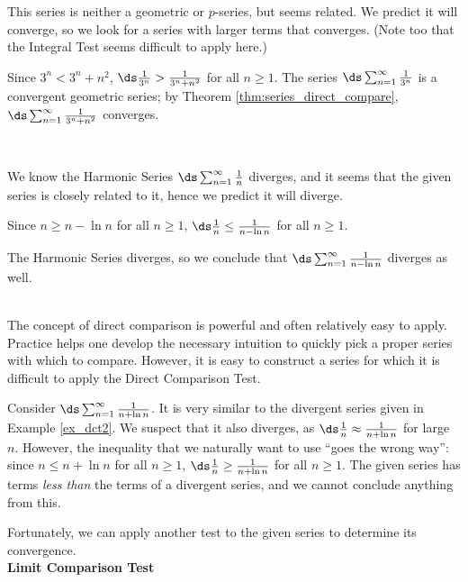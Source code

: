 {This series is neither a geometric or $p$-series, but seems related. We predict it will converge, so we look for a series with larger terms that converges. (Note too that the Integral Test seems difficult to apply here.)

Since $3^n < 3^n+n^2$, $\ds \frac1{3^n}> \frac1{3^n+n^2}$ for all $n\geq1$. The series $\ds\sum_{n=1}^\infty \frac{1}{3^n}$ is a convergent geometric series; by Theorem \ref{thm:series_direct_compare}, $\ds \sum_{n=1}^\infty \frac1{3^n+n^2}$ converges.
}\\

{We know the Harmonic Series $\ds\sum_{n=1}^\infty \frac1n$ diverges, and it seems that the given series is closely related to it, hence we predict it will diverge. 

Since $n\geq n-\ln n$ for all $n\geq 1$, $\ds \frac1n \leq \frac1{n-\ln n}$ for all $n\geq 1$. 

The Harmonic Series diverges, so we conclude that $\ds\sum_{n=1}^\infty \frac{1}{n-\ln n}$ diverges as well.
}\\

The concept of direct comparison is powerful and often relatively easy to apply. Practice helps one develop the necessary intuition to quickly pick a proper series with which to compare. However, it is easy to construct a series for which it is difficult to apply the Direct Comparison Test. 

Consider $\ds\sum_{n=1}^\infty \frac1{n+\ln n}$. It is very similar to the divergent series given in Example \ref{ex_dct2}. We suspect that it also diverges, as $\ds \frac 1n \approx \frac1{n+\ln n}$ for large $n$. However, the inequality that we naturally want to use ``goes the wrong way'': since $n\leq n+\ln n$ for all $n\geq 1$, $\ds\frac1n \geq \frac{1}{n+\ln n}$ for all $n\geq 1$. The given series has terms \textit{less than} the terms of a divergent series, and we cannot conclude anything from this.

Fortunately, we can apply another test to the given series to determine its convergence.\\

\noindent\textbf{\large Limit Comparison Test}\\

